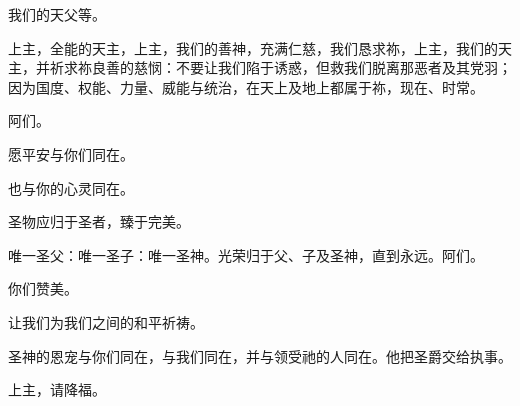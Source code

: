 \par

我们的天父等。\par

\par

上主，全能的天主，上主，我们的善神，充满仁慈，我们恳求祢，上主，我们的天主，并祈求祢良善的慈悯：不要让我们陷于诱惑，但救我们脱离那恶者及其党羽；因为国度、权能、力量、威能与统治，在天上及地上都属于祢，现在、时常。\par

\par

阿们。\par

\par

愿平安与你们同在。\par

\par

也与你的心灵同在。\par

\par

圣物应归于圣者，臻于完美。\par

\par

唯一圣父：唯一圣子：唯一圣神。光荣归于父、子及圣神，直到永远。阿们。\par

\par

你们赞美。\par

\par

让我们为我们之间的和平祈祷。\par

\par

圣神的恩宠与你们同在，与我们同在，并与领受祂的人同在。他把圣爵交给执事。\par

\par

上主，请降福。\par

